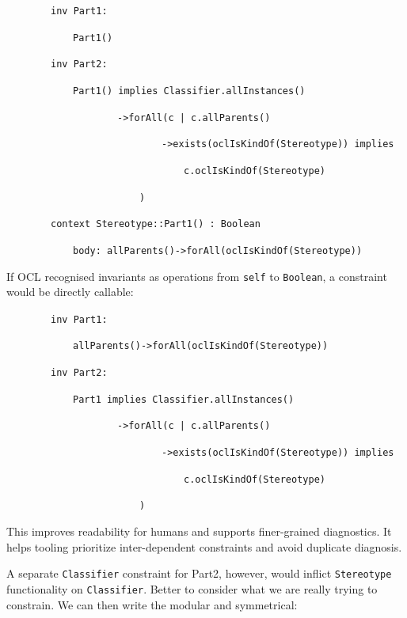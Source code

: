 \documentclass[
]{ceurart}
\begin{document}
\begin{description}[itemsep=-0.2cm]\small
\item ~~~~~~~~\verb!inv Part1:!
\item ~~~~~~~~~~~~\verb!Part1()!
\item ~~~~~~~~\verb!inv Part2:!
\item ~~~~~~~~~~~~\verb!Part1() implies Classifier.allInstances()!
\item ~~~~~~~~~~~~~~~~~~~~\verb!->forAll(c | c.allParents()!
\item ~~~~~~~~~~~~~~~~~~~~~~~~~~~~\verb!->exists(oclIsKindOf(Stereotype)) implies!
\item ~~~~~~~~~~~~~~~~~~~~~~~~~~~~~~~~\verb!c.oclIsKindOf(Stereotype)!
\item ~~~~~~~~~~~~~~~~~~~~~~~~\verb!)!
\item ~~~~~~~~\verb!context Stereotype::Part1() : Boolean!
\item ~~~~~~~~~~~~\verb!body: allParents()->forAll(oclIsKindOf(Stereotype))!
\end{description}

If OCL recognised invariants as operations from \verb!self! to \verb!Boolean!, a constraint would be directly callable:

\begin{description}[itemsep=-0.2cm]\small
\item ~~~~~~~~\verb!inv Part1:!
\item ~~~~~~~~~~~~\verb!allParents()->forAll(oclIsKindOf(Stereotype))!
\item ~~~~~~~~\verb!inv Part2:!
\item ~~~~~~~~~~~~\verb!Part1 implies Classifier.allInstances()!
\item ~~~~~~~~~~~~~~~~~~~~\verb!->forAll(c | c.allParents()!
\item ~~~~~~~~~~~~~~~~~~~~~~~~~~~~\verb!->exists(oclIsKindOf(Stereotype)) implies!
\item ~~~~~~~~~~~~~~~~~~~~~~~~~~~~~~~~\verb!c.oclIsKindOf(Stereotype)!
\item ~~~~~~~~~~~~~~~~~~~~~~~~\verb!)!
\end{description}

This improves readability for humans and supports finer-grained diagnostics. It helps tooling prioritize inter-dependent constraints and avoid duplicate diagnosis.

A separate \verb!Classifier! constraint for Part2, however, would inflict \verb!Stereotype! functionality on \verb!Classifier!. Better to consider what we are really trying to constrain. We can then write the modular and symmetrical:
  
\end{document}
